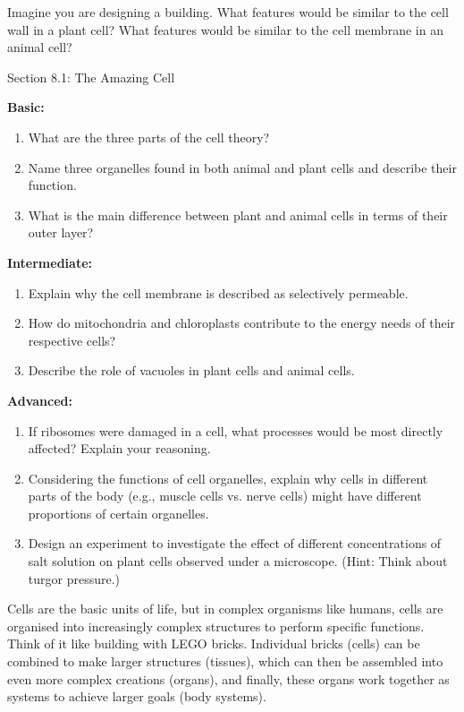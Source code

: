 \begin{stopandthink}
Imagine you are designing a building. What features would be similar to the cell wall in a plant cell?  What features would be similar to the cell membrane in an animal cell?
\end{stopandthink}


\begin{tieredquestions}{Section 8.1: The Amazing Cell}

\textbf{Basic:}
\begin{enumerate}
    \item What are the three parts of the cell theory?
    \item Name three organelles found in both animal and plant cells and describe their function.
    \item What is the main difference between plant and animal cells in terms of their outer layer?
\end{enumerate}

\textbf{Intermediate:}
\begin{enumerate}
    \item Explain why the cell membrane is described as selectively permeable.
    \item How do mitochondria and chloroplasts contribute to the energy needs of their respective cells?
    \item Describe the role of vacuoles in plant cells and animal cells.
\end{enumerate}

\textbf{Advanced:}
\begin{enumerate}
    \item  If ribosomes were damaged in a cell, what processes would be most directly affected? Explain your reasoning.
    \item  Considering the functions of cell organelles, explain why cells in different parts of the body (e.g., muscle cells vs. nerve cells) might have different proportions of certain organelles.
    \item  Design an experiment to investigate the effect of different concentrations of salt solution on plant cells observed under a microscope.  (Hint: Think about turgor pressure.)
\end{enumerate}
\end{tieredquestions}


\FloatBarrier
\1

Cells are the basic units of life, but in complex organisms like humans, cells are organised into increasingly complex structures to perform specific functions.  Think of it like building with LEGO bricks. Individual bricks (cells) can be combined to make larger structures (tissues), which can then be assembled into even more complex creations (organs), and finally, these organs work together as systems to achieve larger goals (body systems).


